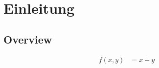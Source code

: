 \chapter{Einleitung}
\blindtext
\section{Overview}
\blindtext[10]
\begin{align}
	f(x,y) &= x + y
\end{align}